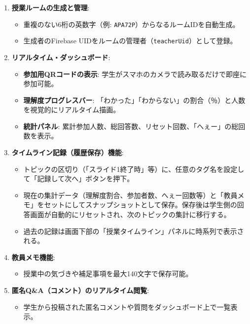\documentclass[11pt,a4paper]{jsarticle}
\begin{document}
\begin{enumerate}
    \item \textbf{授業ルームの生成と管理}:
    \begin{itemize}
        \item 重複のない6桁の英数字（例: \texttt{APA72P}）からなるルームIDを自動生成。
        \item 生成者のFirebase UIDをルームの管理者（\texttt{teacherUid}）として登録。
    \end{itemize}
    
    \item \textbf{リアルタイム・ダッシュボード}:
    \begin{itemize}
        \item \textbf{参加用QRコードの表示}: 学生がスマホのカメラで読み取るだけで即座に参加可能。
        \item \textbf{理解度プログレスバー}: 「わかった」「わからない」の割合（％）と人数を視覚的にリアルタイム描画。
        \item \textbf{統計パネル}: 累計参加人数、総回答数、リセット回数、「へぇー」の総回数を表示。
    \end{itemize}

    \item \textbf{タイムライン記録（履歴保存）機能}:
    \begin{itemize}
        \item トピックの区切り（「スライド1終了時」等）に、任意のタグ名を設定して「記録して次へ」ボタンを押下。
        \item 現在の集計データ（理解度割合、参加者数、へぇー回数等）と「教員メモ」をセットにしてスナップショットとして保存。保存後は学生側の回答画面が自動的にリセットされ、次のトピックの集計に移行する。
        \item 過去の記録は画面下部の「授業タイムライン」パネルに時系列で表示される。
    \end{itemize}
    
    \item \textbf{教員メモ機能}:
    \begin{itemize}
        \item 授業中の気づきや補足事項を最大140文字で保存可能。
    \end{itemize}
    
    \item \textbf{匿名Q\&A（コメント）のリアルタイム閲覧}:
    \begin{itemize}
        \item 学生から投稿された匿名コメントや質問をダッシュボード上で一覧表示。
    \end{itemize}
\end{enumerate}
\end{document}
